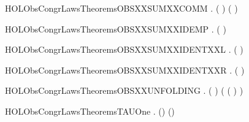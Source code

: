 \newcommand{\HOLObsCongrLawsTheoremsOBSXXSUMXXASSOCXXR}{\UseVerbatim{HOLObsCongrLawsTheoremsOBSXXSUMXXASSOCXXR}}
\begin{SaveVerbatim}{HOLObsCongrLawsTheoremsOBSXXSUMXXCOMM}
\HOLTokenTurnstile{} \HOLSymConst{\HOLTokenForall{}} .  ( \HOLSymConst{\ensuremath{+}} ) ( \HOLSymConst{\ensuremath{+}} )
\end{SaveVerbatim}
\newcommand{\HOLObsCongrLawsTheoremsOBSXXSUMXXCOMM}{\UseVerbatim{HOLObsCongrLawsTheoremsOBSXXSUMXXCOMM}}
\begin{SaveVerbatim}{HOLObsCongrLawsTheoremsOBSXXSUMXXIDEMP}
\HOLTokenTurnstile{} \HOLSymConst{\HOLTokenForall{}}.  ( \HOLSymConst{\ensuremath{+}} ) 
\end{SaveVerbatim}
\newcommand{\HOLObsCongrLawsTheoremsOBSXXSUMXXIDEMP}{\UseVerbatim{HOLObsCongrLawsTheoremsOBSXXSUMXXIDEMP}}
\begin{SaveVerbatim}{HOLObsCongrLawsTheoremsOBSXXSUMXXIDENTXXL}
\HOLTokenTurnstile{} \HOLSymConst{\HOLTokenForall{}}.  ( \HOLSymConst{\ensuremath{+}} ) 
\end{SaveVerbatim}
\newcommand{\HOLObsCongrLawsTheoremsOBSXXSUMXXIDENTXXL}{\UseVerbatim{HOLObsCongrLawsTheoremsOBSXXSUMXXIDENTXXL}}
\begin{SaveVerbatim}{HOLObsCongrLawsTheoremsOBSXXSUMXXIDENTXXR}
\HOLTokenTurnstile{} \HOLSymConst{\HOLTokenForall{}}.  ( \HOLSymConst{\ensuremath{+}} ) 
\end{SaveVerbatim}
\newcommand{\HOLObsCongrLawsTheoremsOBSXXSUMXXIDENTXXR}{\UseVerbatim{HOLObsCongrLawsTheoremsOBSXXSUMXXIDENTXXR}}
\begin{SaveVerbatim}{HOLObsCongrLawsTheoremsOBSXXUNFOLDING}
\HOLTokenTurnstile{} \HOLSymConst{\HOLTokenForall{}} .  (  ) (  (  ) )
\end{SaveVerbatim}
\newcommand{\HOLObsCongrLawsTheoremsOBSXXUNFOLDING}{\UseVerbatim{HOLObsCongrLawsTheoremsOBSXXUNFOLDING}}
\begin{SaveVerbatim}{HOLObsCongrLawsTheoremsTAUOne}
\HOLTokenTurnstile{} \HOLSymConst{\HOLTokenForall{}} .  (\HOLConst{\ensuremath{\tau}}) ()
\end{SaveVerbatim}
